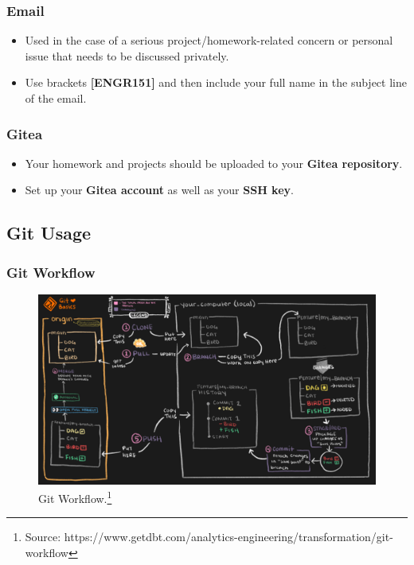 \documentclass[
	11pt, %
]{beamer}
\begin{document}


\begin{frame}
	\frametitle{Email}
 
	\begin{itemize}
    \item Used in the case of a serious project/homework-related concern or personal issue that needs to be discussed privately.
    \item Use brackets \textbf{[ENGR151]} and then include your full name in the subject line of the email.
\end{itemize}

\end{frame}




\begin{frame}
	\frametitle{Gitea}
 
	\begin{itemize}
    \item Your homework and projects should be uploaded to your \textbf{Gitea repository}.
    \item Set up your \textbf{Gitea account} as well as your \textbf{SSH key}.
\end{itemize}

\end{frame}


\subsection{Git Usage}

\begin{frame}
	\frametitle{Git Workflow}
	
	\begin{figure}
		\includegraphics[width=0.8\linewidth]{git_workflow.png}
		\caption{Git Workflow.\footnote{Source: https://www.getdbt.com/analytics-engineering/transformation/git-workflow}}
	\end{figure}
\end{frame}
\end{document}
